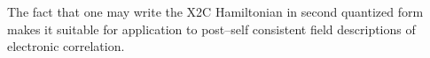 The fact that one may write the X2C Hamiltonian in second quantized form makes it
suitable for application to post--self consistent field descriptions of
electronic correlation. 


